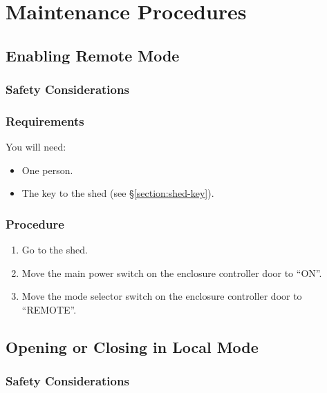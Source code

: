 \section{Maintenance Procedures}

\subsection{Enabling Remote Mode}
\label{section:enclosure-enabling-remote-mode}

\subsubsection{Safety Considerations}


\subsubsection{Requirements}

You will need:

\begin{itemize}
\item One person.
\item The key to the shed (see \S\ref{section:shed-key}).
\end{itemize}

\subsubsection{Procedure}


\begin{enumerate}
\item
Go to the shed.
\item
Move the main power switch on the enclosure controller door to “ON”.
\item
Move the mode selector switch on the enclosure controller door to “REMOTE”.
\end{enumerate}

\subsection{Opening or Closing in Local Mode}
\label{section:enclosure-opening-or-closing-in-local-mode}

\subsubsection{Safety Considerations}

